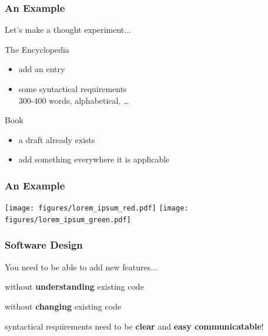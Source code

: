 \documentclass{beamer}
\newenvironment{wideitemize}{
    \itemize\addtolength{\itemsep}{15pt}\addtolength{\topsep}{10pt}}{\enditemize}
\begin{document}
    \begin{frame}
        \frametitle{An Example}
        Let's make a thought experiment...
        \vspace{0.8cm}
        \begin{wideitemize}
            \item The Encyclopedia
            \begin{itemize}
                \item add an entry
                \item some syntactical requirements\\
                {\small 300-400 words, alphabetical, \ldots}
            \end{itemize}
            \item Book
            \begin{itemize}
                \item a draft already exists
                \item add something everywhere it is applicable
            \end{itemize}
        \end{wideitemize}
    \end{frame}

    \begin{frame}
        \frametitle{An Example}\vspace{0.5cm}
        \texttt{[image: figures/lorem\_ipsum\_red.pdf]}%
        \texttt{[image: figures/lorem\_ipsum\_green.pdf]}
    \end{frame}

    \begin{frame}
        \frametitle{Software Design}
        \pause
        You need to be able to add new features...
        \vspace{0.8cm}
        \begin{wideitemize}
            \item without \textbf{understanding} existing code
            \item without \textbf{changing} existing code
            \item syntactical requirements need to be \textbf{clear} and \textbf{easy communicatable}!
        \end{wideitemize}
    \end{frame}
\end{document}
